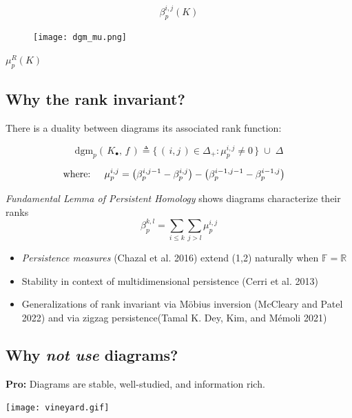 \documentclass[
  letterpaper,
  DIV=11,
  numbers=noendperiod,
  oneside]{scrartcl}
\providecommand{\tightlist}{%
  \setlength{\itemsep}{0pt}\setlength{\parskip}{0pt}}\usepackage{longtable,booktabs,array}
\begin{document}
\[ \beta_p^{i,j}(K)\]

\begin{figure}

{\centering \texttt{[image: dgm\_mu.png]}

}

\end{figure}

\(\mu_p^R(K)\)

\hypertarget{why-the-rank-invariant}{%
\subsection{Why the rank invariant?}\label{why-the-rank-invariant}}

There is a duality between diagrams its associated rank function:

\[ \mathrm{dgm}_p(\, K_\bullet, \, f \, ) \triangleq \{ \, ( \, i, j \,) \in \Delta_+ :  \mu_p^{i,j} \neq 0 \, \} \; \cup \; \Delta \]

\[\text{where: } \quad \mu_p^{i,j} = \left(\beta_p^{i,j{\small -}1} - \beta_p^{i,j} \right) - \left(\beta_p^{i{\small -}1,j{\small -}1} - \beta_p^{i{\small -}1,j} \right) \quad \]

\emph{Fundamental Lemma of Persistent Homology} shows diagrams
characterize their ranks
\[\beta_p^{k,l} = \sum\limits_{i \leq k} \sum\limits_{j > l} \mu_p^{i,j}\]

\begin{itemize}
\tightlist
\item
  \emph{Persistence measures} (Chazal et al. 2016) extend (1,2)
  naturally when \(\mathbb{F} = \mathbb{R}\)
\item
  Stability in context of multidimensional persistence (Cerri et al.
  2013)
\item
  Generalizations of rank invariant via Möbius inversion (McCleary and
  Patel 2022) and via zigzag persistence(Tamal K. Dey, Kim, and Mémoli
  2021)
\end{itemize}

\hypertarget{why-not-use-diagrams}{%
\subsection{\texorpdfstring{Why \emph{not use}
diagrams?}{Why not use diagrams?}}\label{why-not-use-diagrams}}

\textbf{Pro:} Diagrams are stable, well-studied, and information rich.

\texttt{[image: vineyard.gif]}
\end{document}
